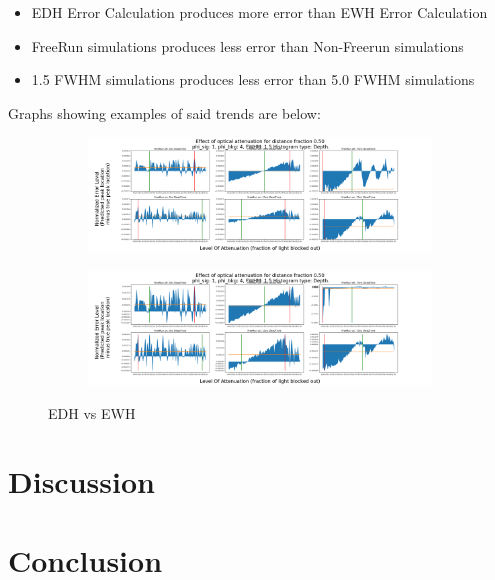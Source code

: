 \documentclass{article}
\begin{document}
\begin{itemize}
  \item EDH Error Calculation produces more error than EWH Error Calculation
  \item FreeRun simulations produces less error than Non-Freerun simulations
  \item 1.5 FWHM simulations produces less error than 5.0 FWHM simulations
\end{itemize}

Graphs showing examples of said trends are below:

\begin{figure}[H]
\centering
\begin{subfigure}[b]{1\textwidth}
\includegraphics[width=1\linewidth]{SharedyExample.png}
\label{fig:Ng1}
\end{subfigure}
\begin{subfigure}[b]{1\textwidth}
\includegraphics[width=1\linewidth]{ZoomedyExample.png}
\label{fig:Ng2}
\end{subfigure}
\caption{\label{fig:Data}EDH vs EWH}
\end{figure}

\section{Discussion}

\section{Conclusion}



\end{document}
